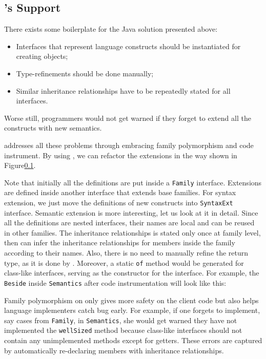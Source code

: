 \subsection{\name's Support}
There exists some boilerplate for the Java solution presented above:
\begin{itemize}
  \item Interfaces that represent language constructs should be instantiated for
    creating objects;
  \item Type-refinements should be done manually;
  \item Similar inheritance relationships have to be repeatedly stated for all interfaces.
\end{itemize}
Worse still, programmers would not get warned if they forget to extend all the
constructs with new semantics.

\name addresses all these problems through embracing family polymorphism and code instrument.
By using \name, we can refactor the extensions in the way shown in Figure\ref{}.

Note that initially all the definitions are put inside a \texttt{Family} interface.
Extensions are defined inside another interface that extends base families.
For syntax extension, we just move the definitions of new constructs into
\texttt{SyntaxExt} interface.
Semantic extension is more interesting, let us look at it in detail.
Since all the definitions are nested interfaces, their names are local and can
be reused in other families. The inheritance relationships is stated only once at family level, then \name can infer the inheritance relationships for members inside the family according to their names. Also, there is no need to
manually refine the return type, as it is done by \name. Moreover, a static \texttt{of}
method would be generated for class-like interfaces, serving as the constructor
for the interface. For example, the \texttt{Beside} inside \texttt{Semantics} after code instrumentation will look like this:

Family polymorphism on only gives more safety on the client code but also helps
language implementers catch bug early.
For example, if one forgets to implement, say cases from \texttt{Family}, in
\texttt{Semantics}, she would get warned they have not implemented the
\texttt{wellSized} method because class-like interfaces should not contain any
unimplemented methods except for getters.
These errors are captured by automatically re-declaring members with inheritance relationships.

